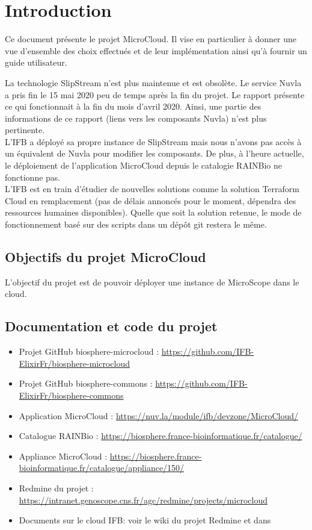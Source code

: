 \section{Introduction}

Ce document présente le projet MicroCloud.
Il vise en particulier à donner une vue d'ensemble des choix effectués
et de leur implémentation ainsi qu'à fournir un guide utilisateur.

\begin{mycolorbox}
	La technologie SlipStream n'est plus maintenue et est obsolète.
	Le service Nuvla a pris fin le 15 mai 2020 peu de temps après la fin du projet.
	Le rapport présente ce qui fonctionnait à la fin du mois d'avril 2020.
	Ainsi, une partie des informations de ce rapport (liens vers les composants Nuvla) n'est plus pertinente.\\
	L'IFB a déployé sa propre instance de SlipStream mais nous n'avons pas accès à un équivalent de Nuvla pour modifier les composants.
	De plus, à l'heure actuelle, le déploiement de l'application MicroCloud depuis le catalogie RAINBio ne fonctionne pas.\\
	L'IFB est en train d'étudier de nouvelles solutions comme la solution Terraform Cloud en remplacement (pas de délais annoncés pour le moment, dépendra des ressources humaines disponibles). Quelle que soit la solution retenue, le mode de fonctionnement basé sur des scripts dans un dépôt git restera le même.
\end{mycolorbox}

\subsection{Objectifs du projet MicroCloud}

L'objectif du projet est de pouvoir déployer une instance de MicroScope dans le cloud.

\subsection{Documentation et code du projet}

\begin{itemize}
	\item Projet GitHub biosphere-microcloud : \url{https://github.com/IFB-ElixirFr/biosphere-microcloud}
	\item Projet GitHub biosphere-commons : \url{https://github.com/IFB-ElixirFr/biosphere-commons}
	\item Application MicroCloud : \url{https://nuv.la/module/ifb/devzone/MicroCloud/}
	\item Catalogue RAINBio : \url{https://biosphere.france-bioinformatique.fr/catalogue/}
	\item Appliance MicroCloud : \url{https://biosphere.france-bioinformatique.fr/catalogue/appliance/150/}
	\item Redmine du projet : \url{https://intranet.genoscope.cns.fr/agc/redmine/projects/microcloud} 
	\item Documents sur le cloud IFB: voir le wiki du projet Redmine et dans 
\end{itemize}

